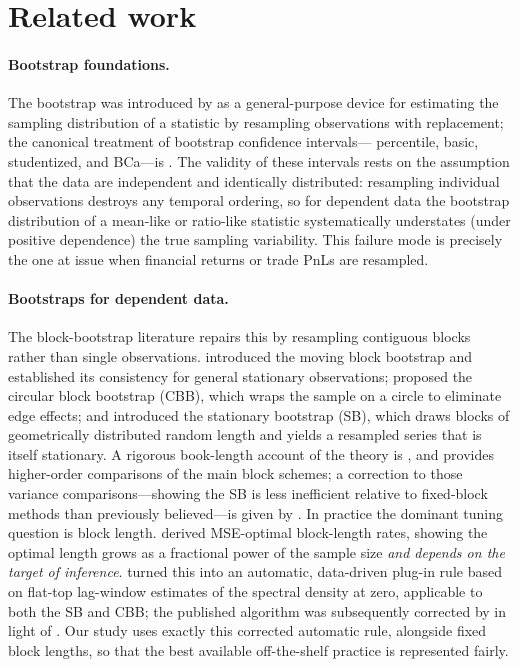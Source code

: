 \documentclass[11pt]{article}
\begin{document}
\section{Related work}
\label{sec:related}

\paragraph{Bootstrap foundations.} The bootstrap was introduced by
\citet{efron1979bootstrap} as a general-purpose device for estimating the
sampling distribution of a statistic by resampling observations with
replacement; the canonical treatment of bootstrap confidence intervals---
percentile, basic, studentized, and BCa---is \citet{efron1993introduction}.
The validity of these intervals rests on the assumption that the data are
independent and identically distributed: resampling individual observations
destroys any temporal ordering, so for dependent data the bootstrap
distribution of a mean-like or ratio-like statistic systematically understates
(under positive dependence) the true sampling variability. This failure mode is
precisely the one at issue when financial returns or trade PnLs are resampled.

\paragraph{Bootstraps for dependent data.} The block-bootstrap literature
repairs this by resampling contiguous blocks rather than single observations.
\citet{kunsch1989jackknife} introduced the moving block bootstrap and
established its consistency for general stationary observations;
\citet{politis1992circular} proposed the circular block bootstrap (CBB), which
wraps the sample on a circle to eliminate edge effects; and
\citet{politis1994stationary} introduced the stationary bootstrap (SB), which
draws blocks of geometrically distributed random length and yields a resampled
series that is itself stationary. A rigorous book-length account of the theory
is \citet{lahiri2003resampling}, and \citet{lahiri1999theoretical} provides
higher-order comparisons of the main block schemes; a correction to those
variance comparisons---showing the SB is less inefficient relative to
fixed-block methods than previously believed---is given by
\citet{nordman2009note}. In practice the dominant tuning question is block
length. \citet{hall1995blocking} derived MSE-optimal block-length rates,
showing the optimal length grows as a fractional power of the sample size
\emph{and depends on the target of inference}. \citet{politis2004automatic}
turned this into an automatic, data-driven plug-in rule based on flat-top
lag-window estimates of the spectral density at zero, applicable to both the SB
and CBB; the published algorithm was subsequently corrected by
\citet{patton2009correction} in light of \citet{nordman2009note}. Our study
uses exactly this corrected automatic rule, alongside fixed block lengths, so
that the best available off-the-shelf practice is represented fairly.
\end{document}

